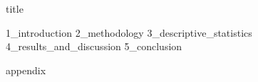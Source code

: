 \documentclass{article}
\begin{document}
{title}

\frontmatter

\renewcommand{\abstractname}{\LARGE Abstract}  %

\begin{abstract}
    {0_abstract}
\end{abstract}
\clearpage



\tableofcontents

\listoffigures
\listoftables

\mainmatter


\twocolumn
{1_introduction}
{2_methodology}
{3_descriptive_statistics}
{4_results_and_discussion}
{5_conclusion}


\onecolumn
\newpage
%
\printbibliography



\addappendix
\appendixtocspacing
{appendix}


\end{document}
